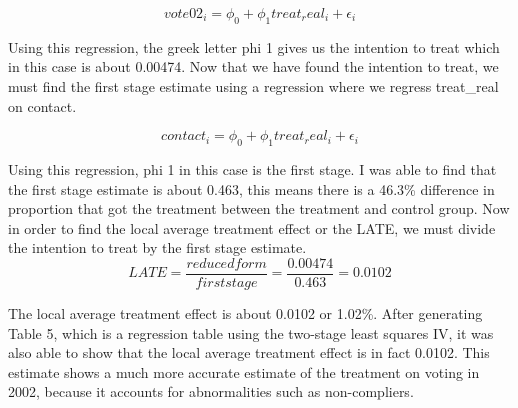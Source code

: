 \documentclass[a4paper]{article}
\begin{document}
\[vote02_i=\phi_0 +\phi_1treat_real_i+\epsilon_i\]
\begin{flushleft}
Using this regression, the greek letter phi 1 gives us the intention to treat which in this case is about 0.00474. Now that we have found the intention to treat, we must find the first stage estimate using a regression where we regress treat\_real on contact. 
\end{flushleft}

\[contact_i=\phi_0 +\phi_1treat_real_i+\epsilon_i\]
\begin{flushleft}
Using this regression, phi 1 in this case is the first stage. I was able to find that the first stage estimate is about 0.463, this means there is a 46.3\% difference in proportion that got the treatment between the treatment and control group.
Now in order to find the local average treatment effect or the LATE, we must divide the intention to treat by the first stage estimate. 
\[LATE=\frac{reduced form}{firststage}=\frac{0.00474}{0.463}=0.0102\]
\end{flushleft}

\begin{flushleft}
The local average treatment effect is about 0.0102 or 1.02\%. After generating Table 5, which is a regression table using the two-stage least squares IV, it was also able to show that the local average treatment effect is in fact 0.0102. This estimate shows a much more accurate estimate of the treatment on voting in 2002, because it accounts for abnormalities such as non-compliers. 
\end{flushleft}
\end{document}
